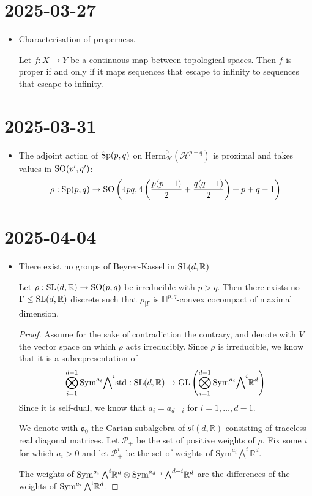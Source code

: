 \documentclass{report}
\begin{document}
\section{2025-03-27}
\begin{itemize}
    \item Characterisation of properness.
    \begin{lemma}
        Let $f: X \to Y$ be a continuous map between topological spaces.
        Then $f$ is proper if and only if it maps sequences that escape to infinity to sequences that escape to infinity.
    \end{lemma}
\end{itemize}
\section{2025-03-31}
\begin{itemize}
    \item The adjoint action of $\operatorname{{\mathrm{Sp}}}(p,q)$ on $\mathrm{Herm}^0_\mathcal H(\mathcal H^{p+q})$ is proximal and takes values in $\operatorname{{\mathrm{SO}}}(p',q')$:
    \[
    \rho : \operatorname{{\mathrm{Sp}}}(p,q) \to \operatorname{{\mathrm{SO}}}\left(4pq, 4\left(\frac{p(p-1)}{2} + \frac{q(q-1)}{2}\right) + p + q - 1\right)
    \]
\end{itemize}
\section{2025-04-04}
\begin{itemize}
    \item There exist no groups of Beyrer-Kassel in $\operatorname{{\mathrm{SL}}}(d,\mathbb R)$
    \begin{lemma}
        Let $\rho: \operatorname{{\mathrm{SL}}}(d,\mathbb R) \to \operatorname{{\mathrm{SO}}}(p,q)$ be irreducible with $p>q$.
        Then there exists no $\Gamma \leq \operatorname{{\mathrm{SL}}}(d, \mathbb R)$ discrete such that $\rho_{|\Gamma}$ is $\mathbb H^{p,q}$-convex cocompact of maximal dimension.
    \end{lemma}
    \begin{proof}
        Assume for the sake of contradiction the contrary, and denote with $V$ the vector space on which $\rho$ acts irreducibly.
        Since $\rho$ is irreducible, we know that it is a subrepresentation of
        \[
            \bigotimes_{i=1}^{d-1} \mathrm{Sym}^{a_i} \mathbb \bigwedge^{i} \mathrm{std}: \operatorname{{\mathrm{SL}}}(d, \mathbb R) \to \operatorname{{\mathrm{GL}}}\left(
        \bigotimes_{i=1}^{d-1} \mathrm{Sym}^{a_i} \mathbb \bigwedge^{i} \mathbb R^d
        \right)
        \]
        Since it is self-dual, we know that $a_i = a_{d-i}$ for $i= 1, \ldots, d-1$.

        We denote with $\mathfrak a_0$ the Cartan subalgebra of $\mathfrak{sl}(d, \mathbb R)$ consisting of traceless real diagonal matrices.
        Let $\mathcal P_+$ be the set of positive weights of $\rho$.
        Fix some $i$ for which $a_i > 0$ and let $\mathcal P_+^i$ be the set of weights of $\mathrm{Sym}^{a_i} \mathbb \bigwedge^{i} \mathbb R^d$.
        
        The weights of $\operatorname{Sym}^{a_i} \mathbb \bigwedge^{i} \mathbb R^d \otimes \operatorname{Sym}^{a_{d-i}} \mathbb \bigwedge^{d-i} \mathbb R^d$ are the differences of the weights of $\operatorname{Sym}^{a_i} \mathbb \bigwedge^{i} \mathbb R^d$.
    \end{proof}
\end{itemize}
\end{document}
